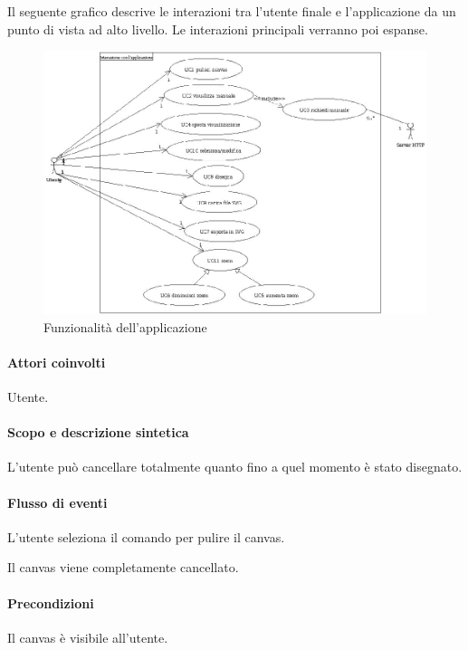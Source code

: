 Il seguente grafico descrive le interazioni tra l'utente finale e l'applicazione da un punto di vista ad alto livello. Le interazioni principali verranno poi espanse.
\begin{figure}[!ht]
\centering
\vspace{20pt} 
\includegraphics{UCInterazione.jpg}
\caption{Funzionalit\`a dell'applicazione}
\end{figure}


\paragraph{Attori coinvolti} Utente.
\paragraph{Scopo e descrizione sintetica}
L'utente pu\`o cancellare totalmente quanto fino a quel momento \`e stato disegnato.
\paragraph{Flusso di eventi}
\begin{elenconumerato}[\textbf{}]{\subsubsecindent}
\item L'utente seleziona il comando per pulire il canvas. 
\item Il canvas viene completamente cancellato.
\end{elenconumerato}
\paragraph{Precondizioni} Il canvas \`e visibile all'utente.
